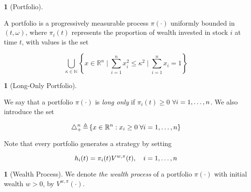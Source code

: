 \documentclass[british]{amsart}
\numberwithin{equation}{section}
\numberwithin{figure}{section}
\theoremstyle{plain}
\theoremstyle{definition}
\newtheorem{defn}[thm]{\protect\definitionname}
\theoremstyle{plain}
\theoremstyle{plain}
\theoremstyle{plain}
\theoremstyle{remark}
\newtheorem{rem}[thm]{\protect\remarkname}
\theoremstyle{plain}
\providecommand{\definitionname}{Definition}
\providecommand{\remarkname}{Remark}
\newcommand{\defeq}{\mathop{\triangleq}}
\begin{document}
\begin{defn} [Portfolio]
	\label{def:portfolio}

	A portfolio is a progressively measurable process $\pi(\cdot)$ uniformly bounded in 
	$(t,\omega)$,	where $\pi_{i}(t)$ represents the proportion of wealth invested in stock 
	$i$ at time $t$, with values is the set

	\begin{equation}
		\bigcup_{\kappa \in \mathbb{N}} 
		\left\{ 
			x \in \mathbb{R}^{n} \mid 
			\sum_{i=1}^{n} x_{i}^2 \le \kappa^2 \mid
			\sum_{i=1}^{n} x_{i} = 1
		\right\} 
 	\end{equation}
\end{defn}

\begin{defn} [Long-Only Portfolio]
	\label{def:longonlyportfolio}

	We say that a portfolio $\pi(\cdot)$ is \textit{long only} if 
	$\pi_{i}(t) \ge 0$ $\forall i=1,\dots,n$. We also introduce the set 

	\begin{equation}
		\triangle_{+}^{n} \defeq 
		\left\{ x\in\mathbb{R}^{n}:x_{i}\ge0\;\forall \rangei \right\} 
 	\end{equation}

\end{defn}

Note that every portfolio generates a strategy by setting 

\begin{equation}
	\label{eq:wealthinvestedbyportfolio}
	h_i(t) = \pi_{i}(t)V^{w,\pi}(t),
	\quad i=1,\dots,n
\end{equation}

\begin{defn} [Wealth Process]
	
	We denote \textit{the wealth process} of a portfolio $\pi(\cdot)$ with initial 
	wealth $w > 0$, by $V^{w,\pi}(\cdot)$.

\end{defn}

 
\end{document}
